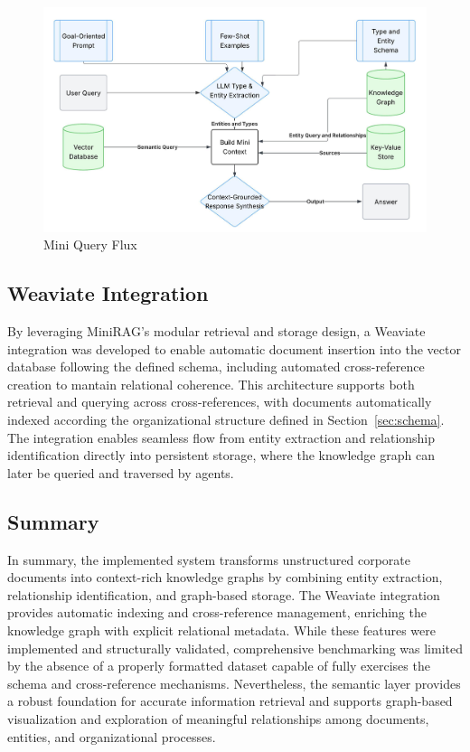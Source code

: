 \begin{figure}
    \centering
    \includegraphics[width=0.75\linewidth]{Images/Fluxograma_Mini_Query.jpeg}
    \caption{Mini Query Flux}\label{fig:mini-query-flux}
\end{figure}

\subsection{Weaviate Integration}

By leveraging MiniRAG's modular retrieval and storage design, a Weaviate integration was developed to enable automatic document insertion into the vector database following the defined schema, including automated cross-reference creation to mantain relational coherence. This architecture supports both retrieval and querying across cross-references, with documents automatically indexed according the organizational structure defined in Section~\ref{sec:schema}. The integration enables seamless flow from entity extraction and relationship identification directly into persistent storage, where the knowledge graph can later be queried and traversed by agents.

\subsection{Summary}

In summary, the implemented system transforms unstructured corporate documents into context-rich knowledge graphs by combining entity extraction, relationship identification, and graph-based storage. The Weaviate integration provides automatic indexing and cross-reference management, enriching the knowledge graph with explicit relational metadata. While these features were implemented and structurally validated, comprehensive benchmarking was limited by the absence of a properly formatted dataset capable of fully exercises the schema and cross-reference mechanisms. Nevertheless, the semantic layer provides a robust foundation for accurate information retrieval and supports graph-based visualization and exploration of meaningful relationships among documents, entities, and organizational processes.

